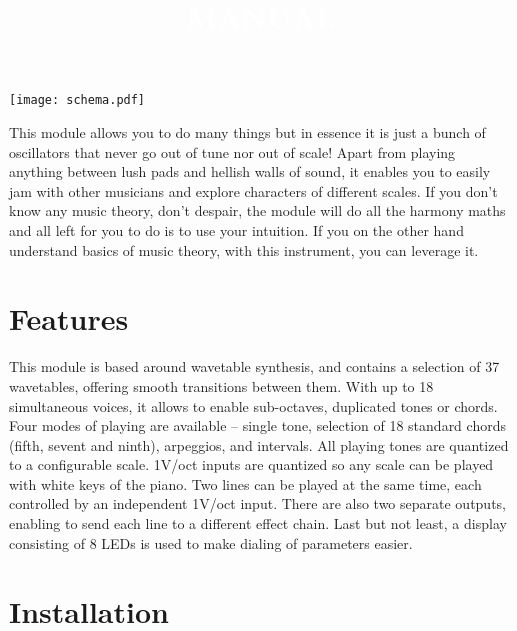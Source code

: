 \documentclass[10pt,nofoldmark,nocombine]{leaflet} %
\begin{document}
\title{\textcolor{white}{MANUAL}}
\author{}
\date{}
\maketitle

\begin{center}
  \texttt{[image: schema.pdf]}
\end{center}

\newpage

\vspace{5mm}

This module allows you to do many things but in essence it is just a bunch of oscillators that never go out of tune nor out of scale! Apart from playing anything between lush pads and hellish walls of sound, it enables you to easily jam with other musicians and explore characters of different scales. If you don't know any music theory, don't despair, the module will do all the harmony maths and all left for you to do is to use your intuition. If you on the other hand understand basics of music theory, with this instrument, you can leverage it.

\section{Features}

This module is based around wavetable synthesis, and contains a selection of 37 wavetables, offering smooth transitions between them. With up to 18 simultaneous voices, it allows to enable sub-octaves, duplicated tones or chords. Four modes of playing are available – single tone, selection of 18 standard chords (fifth, sevent and ninth), arpeggios, and intervals. All playing tones are quantized to a configurable scale. 1V/oct inputs are quantized so any scale can be played with white keys of the piano. Two lines can be played at the same time, each controlled by an independent 1V/oct input. There are also two separate outputs, enabling to send each line to a different effect chain. Last but not least, a display consisting of 8 LEDs is used to make dialing of parameters easier.

\section{Installation}
\end{document}

